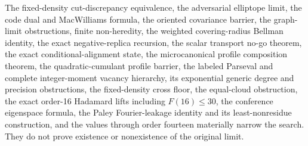\documentclass[11pt]{article}
\begin{document}
The fixed-density cut-discrepancy equivalence, the adversarial elliptope
limit, the code dual and MacWilliams formula, the
oriented covariance barrier, the graph-limit obstructions, finite
non-heredity, the weighted covering-radius Bellman identity, the exact
negative-replica recursion, the scalar transport no-go theorem, the exact
conditional-alignment state, the microcanonical profile composition theorem,
the quadratic-cumulant profile barrier, the labeled Parseval and complete
integer-moment vacancy hierarchy, its exponential generic degree and precision
obstructions, the fixed-density cross floor, the equal-cloud obstruction, the
exact order-16 Hadamard lifts including $F(16)\le30$, the conference
eigenspace formula,
the Paley Fourier-leakage identity and its least-nonresidue construction, and
the values through order fourteen materially
narrow the search.  They do not prove existence or nonexistence of the
original limit.
\end{document}
